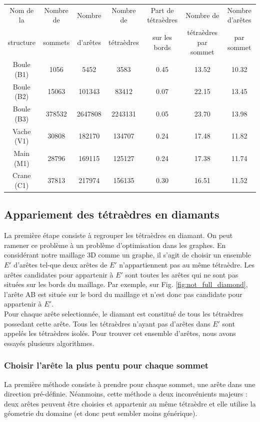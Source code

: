 \documentclass[a4paper,11pt,openany]{article}
\begin{document}
\begin{table}[H]
\footnotesize
\begin{tabular}{|c | c | c | c | c| c | c |}
\hline
Nom de la & Nombre de & Nombre& Nombre de & Part de tétraèdres & Nombre de & Nombre d'arêtes\\
structure&sommets&d'arêtes &tétraèdres&sur les bords&tétraèdres par sommet & par sommet\\
\hline
Boule (B1) & 1056 & 5452 & 3583 & 0.45 & 13.52 & 10.32 \\
Boule (B2)& 15063 & 101343 & 83412 & 0.07 & 22.15 & 13.45\\
Boule (B3)& 378532 & 2647808 & 2243131 & 0.05 & 23.70 & 13.98 \\
Vache (V1)& 30808 & 182170 & 134707 & 0.24 & 17.48 & 11.82 \\
Main (M1)& 28796 & 169115 & 125127 & 0.24 & 17.38 & 11.74\\
Crane (C1)& 37813 & 217974 & 156135 & 0.30 & 16.51 & 11.52 \\ 
\hline  
\end{tabular}
\label{Tab:results_performances}
\end{table}

\subsection{Appariement des tétraèdres en diamants}
\noindent
La première étape consiste à regrouper les tétraèdres en diamant. On peut ramener ce problème à un problème d'optimisation dans les graphes. En considérant notre maillage 3D comme un graphe, il s'agit de choisir un ensemble $E'$ d'arêtes tel-que deux arêtes de $E'$ n'appartiennent pas au même tétraèdre. Les arêtes candidates pour appartenir à  $E'$ sont toutes les arêtes qui ne sont pas situées sur les bords du maillage. Par exemple, sur Fig. \ref{fig:not_full_diamond}, l'arête AB est située sur le bord du maillage et n'est donc pas candidate pour appartenir à $E'$.\\
Pour chaque arête selectionnée, le diamant est constitué de tous les tétraèdres possedant cette arête. Tous les tétraèdres n'ayant pas d'arêtes dans $E'$ sont appelés les tétraèdres isolés. Pour trouver cet ensemble d'arêtes, nous avons essayés plusieurs algorithmes.
\subsubsection{Choisir l'arête la plus pentu pour chaque sommet}
\noindent
La première méthode consiste à prendre pour chaque sommet, une arête dans une direction pré-définie. Néanmoins, cette méthode a deux inconvénients majeurs : deux arêtes peuvent être choisies et appartenir au même tétraèdre et elle utilise la géometrie du domaine (et donc peut sembler moins générique).
\end{document}
